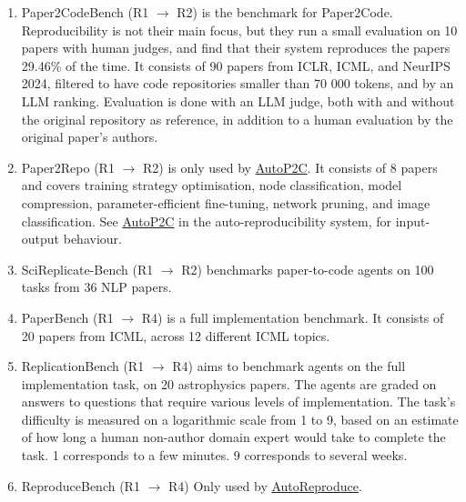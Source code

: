 \documentclass[8pt,a4paper]{article}
\begin{document}
\begin{enumerate} %
    \item Paper2CodeBench\cite[pages~6--8]{paper2code} (R1 $\rightarrow$ R2)
        \subitem is the benchmark for Paper2Code\cite{paper2code}. Reproducibility is not their main focus, but they run a small evaluation on 10 papers with human judges, 
        and find that their system reproduces the papers 29.46\% of the time.
        \subitem It consists of 90 papers from ICLR, ICML, and NeurIPS 2024, filtered to have code repositories smaller than 70 000 tokens, and by an LLM ranking.
        \subitem Evaluation is done with an LLM judge, both with and without the original repository as reference, 
        in addition to a human evaluation by the original paper's authors.
    \item Paper2Repo\cite[pages~7--8]{autop2c} (R1 $\rightarrow$ R2)
        \subitem is only used by \hyperref[itm:autop2cdesc]{AutoP2C}\cite{autop2c}.
        It consists of 8 papers and covers training strategy optimisation, node classification, model compression, 
        parameter-efficient fine-tuning, network pruning, and image classification.
        See \hyperref[itm:autop2cdesc]{AutoP2C}\cite{autop2c} in the auto-reproducibility system,
        for input-output behaviour.
    \item SciReplicate-Bench\cite{scireplicatebench}\label{itm:scireplicatebenchdesc} (R1 $\rightarrow$ R2)
        \subitem benchmarks paper-to-code agents on 100 tasks from 36 NLP papers.
    \item PaperBench\cite{paperbench} (R1 $\rightarrow$ R4)
        \subitem is a full implementation benchmark.
        \subitem It consists of 20 papers from ICML\cite{icml2024}, across 12 different ICML topics.
    \item ReplicationBench\cite{replicationbench} (R1 $\rightarrow$ R4)
        \subitem aims to benchmark agents on the full implementation task, on 20 astrophysics papers.
        The agents are graded on answers to questions that require various levels of implementation.
        The task's difficulty is measured on a logarithmic scale from 1 to 9, 
        based on an estimate of how long a human non-author domain expert would take to complete the task.
        1 corresponds to a few minutes. 9 corresponds to several weeks.
    \item ReproduceBench\cite[pages~5--8]{autoreproduce} (R1 $\rightarrow$ R4)
        \subitem Only used by \hyperref[itm:autoreproducedesc]{AutoReproduce}\cite{autoreproduce}.

\end{enumerate}
\end{document}
